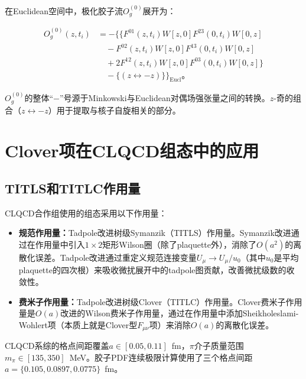 \documentclass[12pt,a4paper]{ctexart}
\theoremstyle{definition}
\begin{document}
在Euclidean空间中，极化胶子流$O^{(0)}_g$展开为\cite{NoteGluonPDFs}：

\begin{equation}
\begin{aligned}
O^{(0)}_g(z, t_i) &= -\Big\{ \{F^{01}(z,t_i)W[z,0]F^{23}(0,t_i)W[0,z] \\
&\quad - F^{02}(z,t_i)W[z,0]F^{13}(0,t_i)W[0,z] \\
&\quad + 2F^{12}(z,t_i)W[z,0]F^{03}(0,t_i)W[0,z]\} \\
&\quad - \{ (z \leftrightarrow -z) \} \Big\}_{\text{Eucl}}。
\end{aligned}
\label{eq:helicity_current}
\end{equation}

$O^{(0)}_g$的整体``$-$''号源于Minkowski与Euclidean对偶场强张量之间的转换。$z$-奇的组合（$z \leftrightarrow -z$）用于提取与核子自旋相关的部分。

\section{Clover项在CLQCD组态中的应用}

\subsection{TITLS和TITLC作用量}

CLQCD合作组使用的组态\cite{CLQCD2024,CLQCD2025}采用以下作用量：

\begin{itemize}
    \item \textbf{规范作用量：}Tadpole改进树级Symanzik（TITLS）作用量。Symanzik改进通过在作用量中引入$1 \times 2$矩形Wilson圈（除了plaquette外），消除了$O(a^2)$的离散化误差。Tadpole改进通过重定义规范连接变量$U_\mu \to U_\mu/u_0$（其中$u_0$是平均plaquette的四次根）来吸收微扰展开中的tadpole图贡献，改善微扰级数的收敛性\cite{CLQCD2025}。

    \item \textbf{费米子作用量：}Tadpole改进树级Clover（TITLC）作用量。Clover费米子作用量是$O(a)$改进的Wilson费米子作用量，通过在作用量中添加Sheikholeslami-Wohlert项（本质上就是Clover型$F_{\mu\nu}$项）来消除$O(a)$的离散化误差。
\end{itemize}

CLQCD系综的格点间距覆盖$a \in [0.05, 0.11]$~fm，$\pi$介子质量范围$m_\pi \in [135, 350]$~MeV\cite{CLQCD2025}。胶子PDF连续极限计算使用了三个格点间距$a = \{0.105, 0.0897, 0.0775\}$~fm\cite{Chen2025gluon}。
\end{document}

